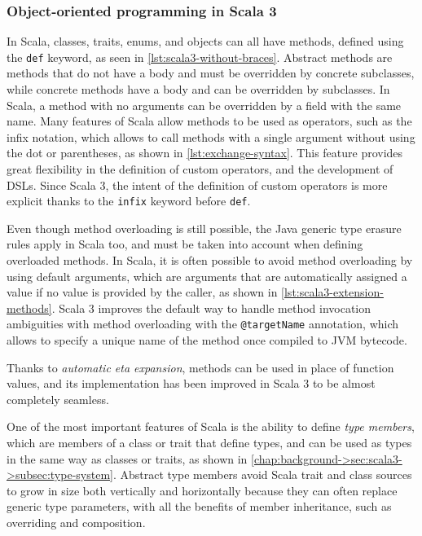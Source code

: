 

\subsubsection{Object-oriented programming in Scala 3}

In Scala, classes, traits, enums, and objects can all have methods, defined using the \texttt{def} keyword, as seen in \cref{lst:scala3-without-braces}.
%
Abstract methods are methods that do not have a body and must be overridden by concrete subclasses, while concrete methods have a body and can be overridden by subclasses.
%
In Scala, a method with no arguments can be overridden by a field with the same name.
%
Many features of Scala allow methods to be used as operators, such as the infix notation, which allows to call methods with a single argument without using the dot or parentheses, as shown in \cref{lst:exchange-syntax}.
%
This feature provides great flexibility in the definition of custom operators, and the development of \ac{DSL}s.
%
Since Scala 3, the intent of the definition of custom operators is more explicit thanks to the \texttt{infix} keyword before \texttt{def}.

Even though method overloading is still possible, the Java generic type erasure rules apply in Scala too, and must be taken into account when defining overloaded methods.
%
In Scala, it is often possible to avoid method overloading by using default arguments, which are arguments that are automatically assigned a value if no value is provided by the caller, as shown in \cref{lst:scala3-extension-methods}.
%
Scala 3 improves the default way to handle method invocation ambiguities with method overloading with the \texttt{@targetName} annotation, which allows to specify a unique name of the method once compiled to \ac{JVM} bytecode.

Thanks to \textit{automatic eta expansion}, methods can be used in place of function values, and its implementation has been improved in Scala 3 to be almost completely seamless.

One of the most important features of Scala is the ability to define \textit{type members},
which are members of a class or trait that define types, and can be used as types in the same way as classes or traits, as shown in \cref{chap:background->sec:scala3->subsec:type-system}.
%
Abstract type members avoid Scala trait and class sources to grow in size both vertically and horizontally because they can often replace generic type parameters, with all the benefits of member inheritance, such as overriding and composition.


